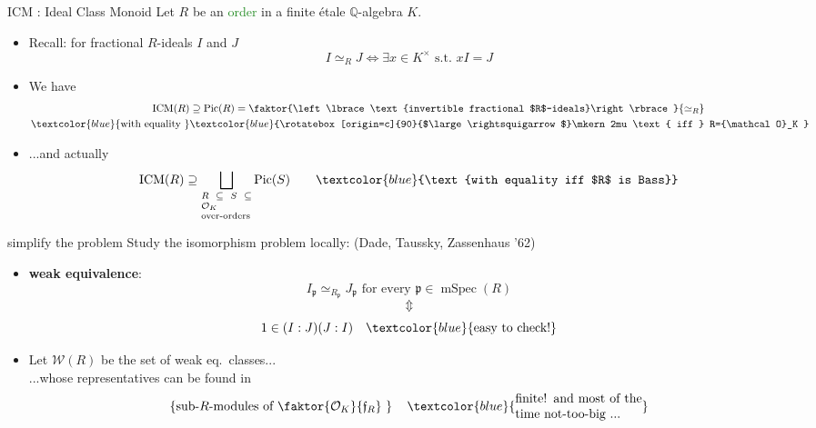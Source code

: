 \documentclass[usenames,dvipsnames,handout]{beamer}
\def\Q{\mathbb{Q}}
\DeclareMathOperator{\ICM}{ICM}
\DeclareMathOperator{\Pic}{Pic}
\DeclareMathOperator{\mSpec}{mSpec}
\newcommand{\cO}{{\mathcal O}}
\newcommand{\cW}{{\mathcal W}}
\newcommand{\p}{{\mathfrak p}}
\newcommand{\frf}{{\mathfrak f}}
\newcommand{\set}[1]{\left\lbrace#1\right\rbrace }
\newcommand{\blue}[1]{\textcolor{blue}{#1}}
\newcommand{\green}[1]{\textcolor{ForestGreen}{#1}}
\begin{document}
\begin{frame}{ICM : Ideal Class Monoid}
Let $R$ be an \green{order} in a finite \'etale  $\Q$-algebra $K$.
\begin{itemize}
   \pause \item Recall: for fractional $R$-ideals $I$ and $J$
	\[ I\simeq_R J \Longleftrightarrow \exists x \in K^\times \text{ s.t.~} xI=J \]
   \pause \item We have
   				\begin{align*}
   					\ICM(R) 	  & \supseteq \Pic(R)=\faktor{\set{\text{invertible fractional $R$-ideals}}}{\simeq_R} \\
	\blue{\text{with equality }} & \blue{\rotatebox[origin=c]{90}{$\large\rightsquigarrow$}\mkern2mu \text{ iff } R=\cO_K }
   				\end{align*}
   \pause \item ...and actually
   \[ \ICM(R) \supseteq \bigsqcup_{\scriptsize\parbox{5 em}{$R\subseteq S \subseteq \cO_K$\\over-orders}}\Pic(S) \qquad \textcolor{blue}{\text{with equality iff $R$ is Bass}} \] 
\end{itemize}
\end{frame}

\begin{frame}{ simplify the problem  }
Study the isomorphism problem locally: (Dade, Taussky, Zassenhaus '62)
\begin{itemize}
\pause \item  \textbf{weak equivalence}:
	\[I_{\p}\simeq_{R_{\p}} J_{\p} \text{ for every } {\p} \in \mSpec(R)\]
\pause \vspace{-6mm}\[\Updownarrow\]
	\[1\in (I:J)(J:I)\quad \textcolor{blue}{\text{easy to check!}}\]
\pause \item Let $\cW(R)$ be the set of weak eq.~classes...\\
\pause ...whose representatives can be found in
	\[\set{\text{sub-$R$-modules of $\faktor{\cO_K}{\frf_R}$ }} \quad \textcolor{blue}{\parbox{10 em}{finite! and most of the time not-too-big ...}}\]
\end{itemize}
\end{frame}
\end{document}
